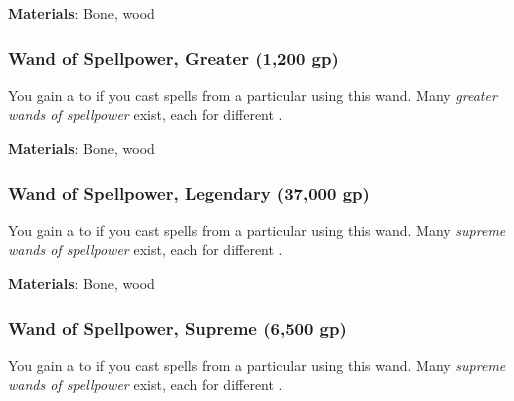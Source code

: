 \vspace{0.25em}
\textbf{Materials}: Bone, wood


\lowercase{\hypertarget{item:Wand of Spellpower, Greater}{}}\label{item:Wand of Spellpower, Greater}
\hypertarget{item:Wand of Spellpower, Greater}{\subsubsection{Wand of Spellpower, Greater\hfill{} (1,200 gp)}}

You gain a   to  if you cast spells from a particular  using this wand.
Many \textit{greater wands of spellpower} exist, each for different .



\vspace{0.25em}
\textbf{Materials}: Bone, wood


\lowercase{\hypertarget{item:Wand of Spellpower, Legendary}{}}\label{item:Wand of Spellpower, Legendary}
\hypertarget{item:Wand of Spellpower, Legendary}{\subsubsection{Wand of Spellpower, Legendary\hfill{} (37,000 gp)}}

You gain a   to  if you cast spells from a particular  using this wand.
Many \textit{supreme wands of spellpower} exist, each for different .



\vspace{0.25em}
\textbf{Materials}: Bone, wood


\lowercase{\hypertarget{item:Wand of Spellpower, Supreme}{}}\label{item:Wand of Spellpower, Supreme}
\hypertarget{item:Wand of Spellpower, Supreme}{\subsubsection{Wand of Spellpower, Supreme\hfill{} (6,500 gp)}}

You gain a   to  if you cast spells from a particular  using this wand.
Many \textit{supreme wands of spellpower} exist, each for different .



